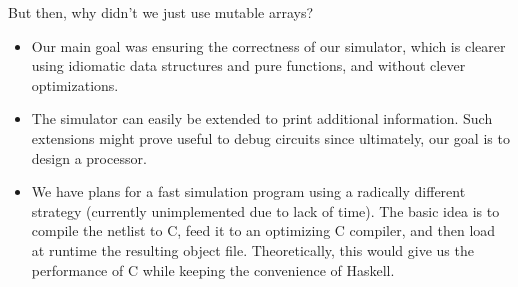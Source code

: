 \documentclass[a4paper, 11pt]{article}
\begin{document}
But then, why didn't we just use mutable arrays?
\begin{itemize} 
\item Our main goal was ensuring the correctness of our simulator, which is clearer using idiomatic data structures and pure functions, and without clever optimizations.
\item The simulator can easily be extended to print additional information. Such extensions might prove useful to debug circuits since ultimately, our goal is to design a processor.
\item We have plans for a fast simulation program using a radically different strategy (currently unimplemented due to lack of time). The basic idea is to compile the netlist to C, feed it to an optimizing C compiler, and then load at runtime the resulting object file. Theoretically, this would give us the performance of C while keeping the convenience of Haskell.
\end{itemize}




\end{document}
